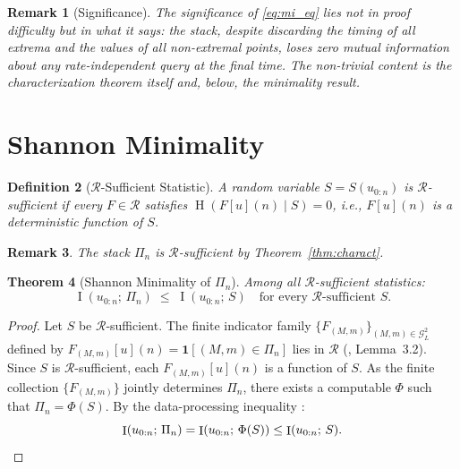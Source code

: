 \documentclass[lettersize,journal]{IEEEtran}
\newtheorem{theorem}{Theorem}
\newtheorem{definition}[theorem]{Definition}
\newtheorem{remark}[theorem]{Remark}
\newcommand{\cR}{\mathcal{R}}
\newcommand{\stack}{\Pi}
\newcommand{\GL}{\mathcal{G}_L}
\DeclareMathOperator{\MI}{I}
\DeclareMathOperator{\En}{H}
\begin{document}
\begin{remark}[Significance]
\label{rem:trivial}
The significance of \eqref{eq:mi_eq} lies not in proof difficulty
but in what it says: the stack, despite discarding the timing of all
extrema and the values of all non-extremal points, loses \emph{zero}
mutual information about any rate-independent query at the final time.
The non-trivial content is the characterization theorem itself and,
below, the \emph{minimality} result.
\end{remark}

\section{Shannon Minimality}
\label{sec:minimal}

\begin{definition}[$\cR$-Sufficient Statistic]
\label{def:suff_R}
A random variable $S = S(u_{0:n})$ is \emph{$\cR$-sufficient} if
every $F \in \cR$ satisfies $\En(F[u](n)\mid S) = 0$, i.e.,
$F[u](n)$ is a deterministic function of $S$.
\end{definition}

\begin{remark}
The stack $\stack_n$ is $\cR$-sufficient by
Theorem~\ref{thm:charact}.
\end{remark}

\begin{theorem}[Shannon Minimality of $\stack_n$]
\label{thm:minimal}
Among all $\cR$-sufficient statistics:
\begin{equation}
  \MI(u_{0:n};\,\stack_n)
  \;\leq\;
  \MI(u_{0:n};\,S)
  \quad\text{for every $\cR$-sufficient }S.
\end{equation}
\end{theorem}

\begin{proof}
Let $S$ be $\cR$-sufficient.
The finite indicator family $\{F_{(M,m)}\}_{(M,m)\in\GL^2}$ defined
by $F_{(M,m)}[u](n) = \mathbf{1}[(M,m)\in\stack_n]$ lies in $\cR$
(\cite{Frydrych2026IPL}, Lemma~3.2).
Since $S$ is $\cR$-sufficient, each $F_{(M,m)}[u](n)$ is a function
of $S$.
As the finite collection $\{F_{(M,m)}\}$ jointly determines
$\stack_n$, there exists a computable $\Phi$ such that
$\stack_n = \Phi(S)$.
By the data-processing inequality
\cite[Th.~2.8.1]{CoverThomas2006}:
\begin{equation*}
  \MI(u_{0:n};\,\stack_n)
  = \MI(u_{0:n};\,\Phi(S))
  \leq \MI(u_{0:n};\,S). \qedhere
\end{equation*}
\end{proof}
\end{document}
